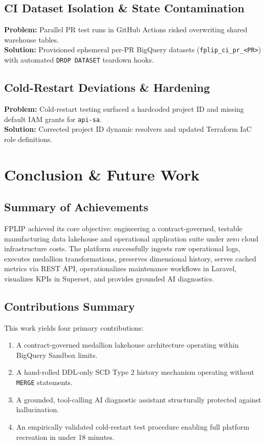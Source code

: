 \documentclass[12pt, a4paper]{report}
\begin{document}
\section{CI Dataset Isolation \& State Contamination}
\textbf{Problem:} Parallel PR test runs in GitHub Actions risked overwriting shared warehouse tables. \\
\textbf{Solution:} Provisioned ephemeral per-PR BigQuery datasets (\texttt{fplip\_ci\_pr\_<PR>}) with automated \texttt{DROP DATASET} teardown hooks.

\section{Cold-Restart Deviations \& Hardening}
\textbf{Problem:} Cold-restart testing surfaced a hardcoded project ID and missing default IAM grants for \texttt{api-sa}. \\
\textbf{Solution:} Corrected project ID dynamic resolvers and updated Terraform IaC role definitions.

\chapter{Conclusion \& Future Work}
\label{chap:conclusion}

\section{Summary of Achievements}
FPLIP achieved its core objective: engineering a contract-governed, testable manufacturing data lakehouse and operational application suite under zero cloud infrastructure costs. The platform successfully ingests raw operational logs, executes medallion transformations, preserves dimensional history, serves cached metrics via REST API, operationalizes maintenance workflows in Laravel, visualizes KPIs in Superset, and provides grounded AI diagnostics.

\section{Contributions Summary}
This work yields four primary contributions:
\begin{enumerate}
    \item A contract-governed medallion lakehouse architecture operating within BigQuery Sandbox limits.
    \item A hand-rolled DDL-only SCD Type 2 history mechanism operating without \texttt{MERGE} statements.
    \item A grounded, tool-calling AI diagnostic assistant structurally protected against hallucination.
    \item An empirically validated cold-restart test procedure enabling full platform recreation in under 18 minutes.
\end{enumerate}
\end{document}
